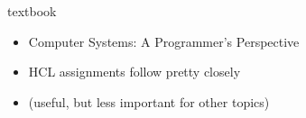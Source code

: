 \begin{frame}{textbook}
    \begin{itemize}
    \item Computer Systems: A Programmer's Perspective
    \item HCL assignments follow pretty closely
    \item (useful, but less important for other topics)
    \end{itemize}
\end{frame}
